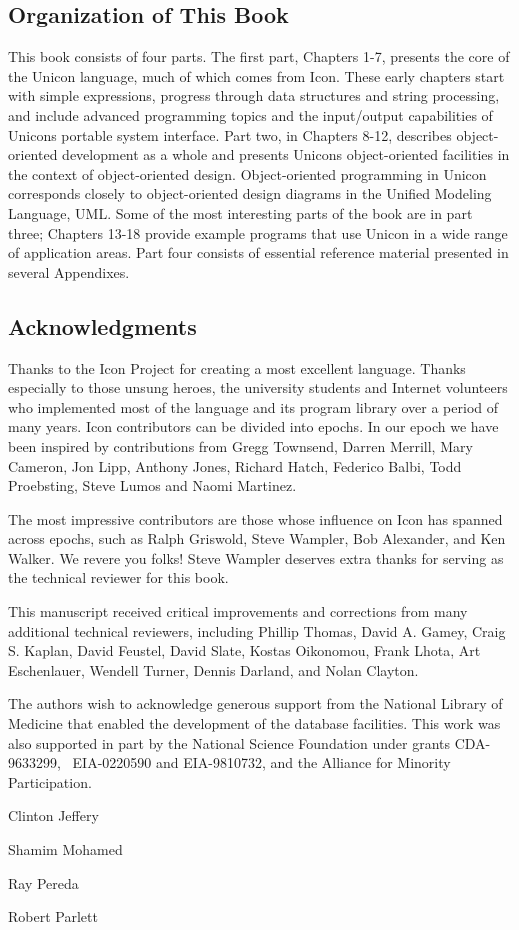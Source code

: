 \subsection{Organization of This Book}
This book consists of four parts. The first part, Chapters 1-7, presents
the core of the Unicon language, much of which comes from Icon. These
early chapters start with simple expressions, progress through data
structures and string processing, and include advanced programming
topics and the input/output capabilities of Unicon{\textquotesingle}s
portable system interface. Part two, in Chapters 8-12, describes
object-oriented development as a whole and presents
Unicon{\textquotesingle}s object-oriented facilities in the context of
object-oriented design. Object-oriented programming in Unicon
corresponds closely to object-oriented design diagrams in the Unified
Modeling Language, UML. Some of the most interesting parts of the book
are in part three; Chapters 13-18 provide example programs that use
Unicon in a wide range of application areas. Part four consists of
essential reference material presented in several Appendixes.

\subsection{Acknowledgments}
Thanks to the Icon Project for creating a most excellent language.
Thanks especially to those unsung heroes, the university students and
Internet volunteers who implemented most of the language and its
program library over a period of many years. Icon contributors can be
divided into epochs. In our epoch we have been inspired by
contributions from Gregg Townsend, Darren Merrill, Mary Cameron, Jon
Lipp, Anthony Jones, Richard Hatch, Federico Balbi, Todd Proebsting,
Steve Lumos and Naomi Martinez.

The most impressive contributors are those whose influence on Icon has
spanned across epochs, such as Ralph Griswold, Steve Wampler, Bob
Alexander, and Ken Walker. We revere you folks! Steve Wampler deserves
extra thanks for serving as the technical reviewer for this book.

This manuscript received critical improvements and corrections from many
additional technical reviewers, including Phillip Thomas, David A.
Gamey, Craig S. Kaplan, David Feustel, David Slate, Kostas Oikonomou,
Frank Lhota, Art Eschenlauer, Wendell Turner, Dennis Darland, and Nolan
Clayton.

The authors wish to acknowledge generous support from the National
Library of Medicine that enabled the development of the database
facilities. This work was also supported in part by the National
Science Foundation under grants CDA-9633299, \ EIA-0220590 and
EIA-9810732, and the Alliance for Minority Participation.

Clinton Jeffery

Shamim Mohamed

Ray Pereda

Robert Parlett
